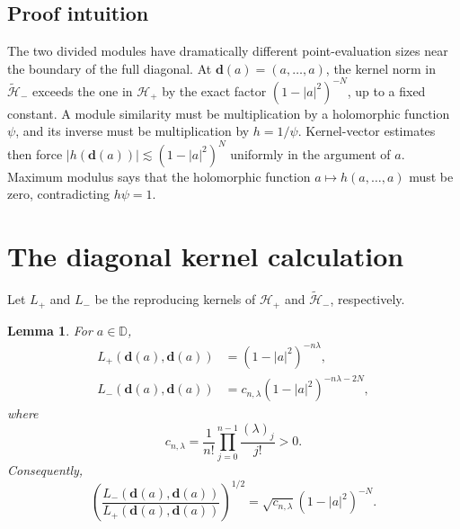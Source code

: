 \documentclass[11pt]{article}
\newtheorem{lemma}[theorem]{Lemma}
\newcommand{\D}{\mathbb D}
\newcommand{\cH}{\mathcal H}
\newcommand{\diagpt}[1]{\boldsymbol d(#1)}
\begin{document}
\subsection*{Proof intuition}

The two divided modules have dramatically different point-evaluation sizes
near the boundary of the full diagonal.  At
$\diagpt a=(a,\ldots,a)$, the kernel norm in $\widetilde{\cH}_-$ exceeds the
one in $\cH_+$ by the exact factor
$(1-|a|^2)^{-N}$, up to a fixed constant.  A module similarity must be
multiplication by a holomorphic function $\psi$, and its inverse must be
multiplication by $h=1/\psi$.  Kernel-vector estimates then force
$|h(\diagpt a)|\lesssim(1-|a|^2)^N$ uniformly in the argument of $a$.
Maximum modulus says that the holomorphic function $a\mapsto h(a,\ldots,a)$
must be zero, contradicting $h\psi=1$.

\section{The diagonal kernel calculation}

Let $L_+$ and $L_-$ be the reproducing kernels of $\cH_+$ and
$\widetilde{\cH}_-$, respectively.

\begin{lemma}\label{kernel-lemma}
For $a\in\D$,
\begin{align*}
 L_+(\diagpt a,\diagpt a)
   &=(1-|a|^2)^{-n\lambda},\\
 L_-(\diagpt a,\diagpt a)
   &=c_{n,\lambda}(1-|a|^2)^{-n\lambda-2N},
\end{align*}
where
\[
 c_{n,\lambda}
 =\frac1{n!}\prod_{j=0}^{n-1}\frac{(\lambda)_j}{j!}>0.
\]
Consequently,
\[
 \left(\frac{L_-(\diagpt a,\diagpt a)}
 {L_+(\diagpt a,\diagpt a)}\right)^{1/2}
 =\sqrt{c_{n,\lambda}}(1-|a|^2)^{-N}.
\]
\end{lemma}
\end{document}
